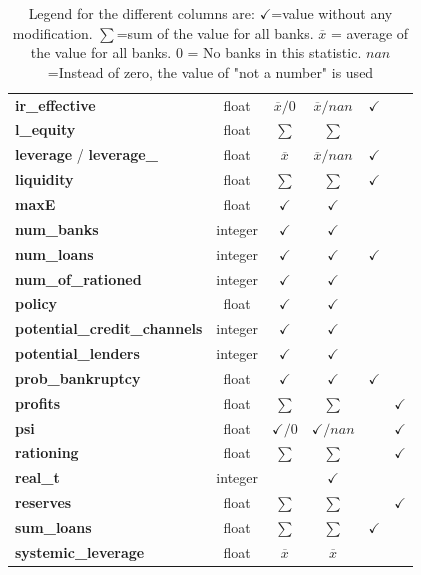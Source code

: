 \documentclass{article}
\begin{document}
\begin{table}[h]
\begin{tabular}{|l|c|c|c|c|c|}
\textbf{ir\_effective}     &  float &  $\overline{x}/0$ & $\overline{x} / nan $  & $\checkmark$ &  \\
\textbf{l\_equity}         & float &  $ \sum$ &  $ \sum $ & & \\
\textbf{leverage} / \textbf{leverage\_}         & float  &  $\overline{x}$ & $\overline{x}/nan $  & $\checkmark$  &  \\
\textbf{liquidity}         &  float &  $\sum$ &  $\sum$ &  $\checkmark$ &    \\
\textbf{maxE}        &  float &  $\checkmark$ & $\checkmark$ &  & \\
\textbf{num\_banks}        &  integer &  $\checkmark$ & $\checkmark$ &  & \\
\textbf{num\_loans}        &  integer &  $ \checkmark$ &  $\checkmark$ & $\checkmark$ &  \\
\textbf{num\_of\_rationed} & integer &  $\checkmark$ & $\checkmark$ &  & \\
\textbf{policy}            & float &  $\checkmark$ & $\checkmark$ &  & \\
\textbf{potential\_credit\_channels} & integer &  $\checkmark$ & $\checkmark$ &  & \\
\textbf{potential\_lenders} & integer &  $\checkmark$ & $\checkmark$ &  & \\
\textbf{prob\_bankruptcy}  &  float &  $\checkmark$ & $\checkmark$  &  $\checkmark$  & \\
\textbf{profits}           & float &  $ \sum$ &  $ \sum$ &  & $\checkmark$ \\
\textbf{psi}               &  float &  $\checkmark/0 $ & $\checkmark/nan $ &  & $\checkmark$ \\
\textbf{rationing}         &  float &  $\sum$ &  $\sum$ &  & $\checkmark$  \\
\textbf{real\_t}         &  integer &  &  $\checkmark$ &  &   \\
\textbf{reserves}          & float & $ \sum$ &  $ \sum$ &  & $\checkmark$ \\
\textbf{sum\_loans}        & float &  $ \sum$ &  $ \sum$ & $\checkmark$ &  \\
\textbf{systemic\_leverage} & float &  $\overline{x}$ & $ \overline{x} $  &  &  \\
\hline
\end{tabular}
\caption{ Legend for the different columns are: $\checkmark$=value without any modification. $\sum$=sum of the value for all banks. $ \overline{x}$ = average of the value for all banks. $0$ = No banks in this statistic. $nan$=Instead of zero, the value of "not a number" is used}
\label{table1}
\end{table}
\end{document}
